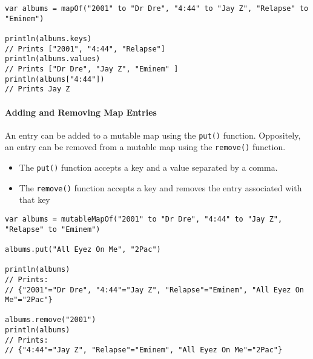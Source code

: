 \begin{verbatim}
var albums = mapOf("2001" to "Dr Dre", "4:44" to "Jay Z", "Relapse" to "Eminem")

println(albums.keys)
// Prints ["2001", "4:44", "Relapse"]
println(albums.values)
// Prints ["Dr Dre", "Jay Z", "Eminem" ]
println(albums["4:44"])
// Prints Jay Z
\end{verbatim}

\paragraph{Adding and Removing Map Entries}
An entry can be added to a mutable map using the \verb!put()! function. 
Oppositely, an entry can be removed from a mutable map using the \verb!remove()! function.

\begin{itemize}
    \item The \verb!put()! function accepts a key and a value separated by a comma.
    \item The \verb!remove()! function accepts a key and removes the entry associated with that key
\end{itemize}

\begin{verbatim}
var albums = mutableMapOf("2001" to "Dr Dre", "4:44" to "Jay Z", "Relapse" to "Eminem")

albums.put("All Eyez On Me", "2Pac")

println(albums)
// Prints: 
// {"2001"="Dr Dre", "4:44"="Jay Z", "Relapse"="Eminem", "All Eyez On Me"="2Pac"}

albums.remove("2001")
println(albums)
// Prints: 
// {"4:44"="Jay Z", "Relapse"="Eminem", "All Eyez On Me"="2Pac"}
\end{verbatim}
